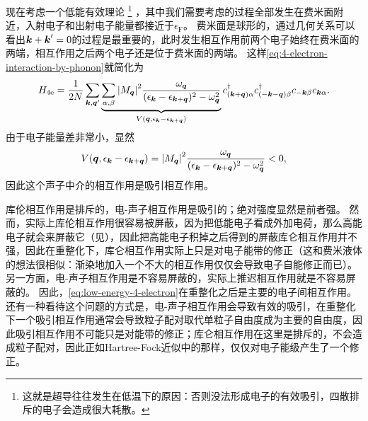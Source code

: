 \documentclass[hyperref, UTF8, a4paper]{ctexart}
\renewcommand{\autoref}{\prettyref}
\begin{document}
现在考虑一个低能有效理论%
\footnote{这就是超导往往发生在低温下的原因：否则没法形成电子的有效吸引，四散排斥的电子会造成很大耗散。}%
，其中我们需要考虑的过程全部发生在费米面附近，入射电子和出射电子能量都接近于$\epsilon_\text{F}$。
费米面是球形的，通过几何关系可以看出$\vb*{k} + \vb*{k}' = 0$的过程是最重要的，此时发生相互作用前两个电子始终在费米面的两端，相互作用之后两个电子还是位于费米面的两端。
这样\eqref{eq:4-electron-interaction-by-phonon}就简化为
\begin{equation}
    {H}_{4\text{e}} = \frac{1}{2N} \sum_{\vb*{k}, \vb*{q}'} \underbrace{\sum_{\alpha, \beta} \abs{M_{\vb*{q}}}^2 \frac{\omega_{\vb*{q}}}{(\epsilon_{\vb*{k}} - \epsilon_{\vb*{k}+\vb*{q}})^2 - \omega_{\vb*{q}}^2}}_{V(\vb*{q}, \epsilon_{\vb*{k}} - \epsilon_{\vb*{k}+\vb*{q}})} {c}^\dagger_{(\vb*{k}+\vb*{q}) \alpha} {c}^\dagger_{(-\vb*{k}-\vb*{q}) \beta} {c}_{-\vb*{k} \beta} {c}_{\vb*{k} \alpha}.
    \label{eq:low-energy-4-electron}
\end{equation}
由于电子能量差非常小，显然
\[
    V(\vb*{q}, \epsilon_{\vb*{k}} - \epsilon_{\vb*{k}+\vb*{q}}) = \abs{M_{\vb*{q}}}^2 \frac{\omega_{\vb*{q}}}{(\epsilon_{\vb*{k}} - \epsilon_{\vb*{k}+\vb*{q}})^2 - \omega_{\vb*{q}}^2} < 0,
\]
因此这个声子中介的相互作用是吸引相互作用。

库伦相互作用是排斥的，电-声子相互作用是吸引的；绝对强度显然是前者强。
然而，实际上库伦相互作用很容易被屏蔽，因为把低能电子看成外加电荷，那么高能电子就会来屏蔽它（见\autoref{sec:ext-e}），因此把高能电子积掉之后得到的屏蔽库仑相互作用并不强，因此在重整化下，库仑相互作用实际上只是对电子能带的修正（这和费米液体的想法很相似：渐染地加入一个不大的相互作用仅仅会导致电子自能修正而已）。
另一方面，电-声子相互作用是不容易屏蔽的，实际上推迟相互作用就是不容易屏蔽的。
因此，\eqref{eq:low-energy-4-electron}在重整化之后是主要的电子间相互作用。
还有一种看待这个问题的方式是，电-声子相互作用会导致有效的吸引，在重整化下一个吸引相互作用通常会导致粒子配对取代单粒子自由度成为主要的自由度，因此吸引相互作用不可能只是对能带的修正；库仑相互作用在这里是排斥的，不会造成粒子配对，因此正如Hartree-Fock近似中的那样，仅仅对电子能级产生了一个修正。
\end{document}

